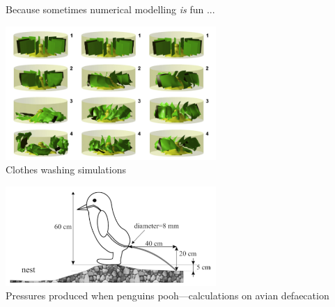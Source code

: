 Because sometimes numerical modelling {\sl is} fun ...

\begin{center}
\includegraphics[width=8cm]{images/interesting/akds14}\\
{\small Clothes washing simulations \cite{akds14}}
\end{center}


\begin{center}
\includegraphics[width=8cm]{images/interesting/mega03}\\
{\small Pressures produced when penguins pooh—calculations on avian defaecation \cite{mega03}}
\end{center}


